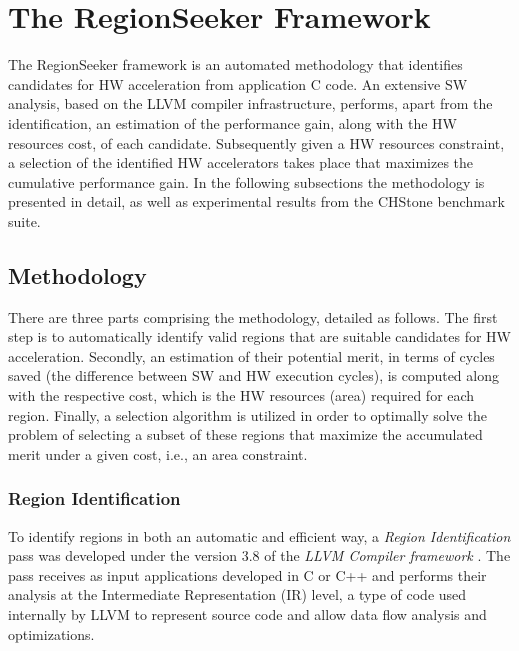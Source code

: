\documentclass[]{usiinfthesis}
\begin{document}
\section{The RegionSeeker Framework}
\label{sec:rs}

The RegionSeeker framework is an automated methodology that 
identifies candidates for HW acceleration from application C 
code. An extensive SW analysis, based on the LLVM compiler infrastructure,
performs, apart from
the identification, an estimation of the performance gain, along with
the HW resources cost, of each candidate. Subsequently given a HW resources
constraint, a selection of the identified HW accelerators takes place that
maximizes the cumulative performance gain.
In the following subsections the methodology is presented in detail, as well as
experimental results from the CHStone benchmark \cite{HaraMay08} suite.

\subsection{Methodology}
\label{subsec:meth}

There are three parts comprising the methodology, detailed as follows.
The first step is to automatically identify valid regions that are suitable candidates
for HW acceleration. Secondly, an estimation of their potential merit, in terms of cycles saved
(the difference between SW and HW execution cycles),
is computed along with the respective cost, which is the HW resources (area) required
for each region. Finally, a selection algorithm is utilized in order to optimally solve the 
problem of selecting a subset of these
regions that maximize the accumulated merit under a given cost, i.e., an area constraint.

\subsubsection{Region Identification}
\label{subsec:reg_id}

To identify regions in both an automatic and efficient way, a
 \emph{Region Identification} pass was developed under the version 3.8 
of the \emph{LLVM Compiler framework} \cite{LattnerMar04}. 
The pass receives as input applications developed in C or C++ and performs 
their analysis at the Intermediate Representation (IR) level, a type
of code used internally by LLVM to represent source code and allow
data flow analysis and optimizations.\par
\end{document}

